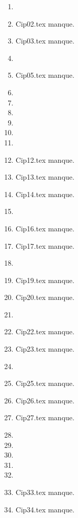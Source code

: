 \begin{enumerate}
  \item  
  \item Cip02.tex manque. 
  \item Cip03.tex manque. 
  \item  
  \item Cip05.tex manque. 
  \item  
  \item  
  \item  
  \item  
  \item  
  \item  
  \item Cip12.tex manque. 
  \item Cip13.tex manque. 
  \item Cip14.tex manque. 
  \item  
  \item Cip16.tex manque. 
  \item Cip17.tex manque. 
  \item  
  \item Cip19.tex manque. 
  \item Cip20.tex manque. 
  \item  
  \item Cip22.tex manque. 
  \item Cip23.tex manque. 
  \item  
  \item Cip25.tex manque. 
  \item Cip26.tex manque. 
  \item Cip27.tex manque. 
  \item  
  \item  
  \item  
  \item  
  \item  
  \item Cip33.tex manque. 
  \item Cip34.tex manque. 
\end{enumerate} 
